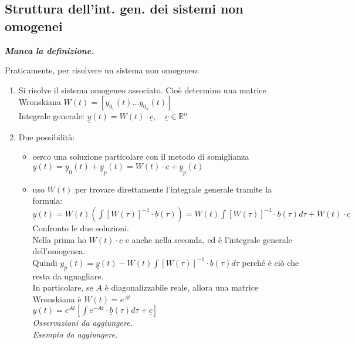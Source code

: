 \documentclass{scrreprt}
\begin{document}
\subsection{Struttura dell'int. gen. dei sistemi non omogenei}
\begin{center}
	\emph{\textbf{Manca la definizione.}}
\end{center}

Praticamente, per risolvere un sistema non omogeneo:
\begin{enumerate}
	\item Si risolve il sistema omogeneo associato. Cioè determino una matrice Wronskiana $W(t) = \left[y_{0_1}(t)\ldots y_{0_n}(t)\right]$\\
			Integrale generale: $ \underline{y}(t) = W(t)\cdot \underline{c}, \quad \underline{c}\in\mathbb{R}^n$
	\item Due possibilità: \begin{itemize}
		\item cerco una soluzione particolare con il metodo di somiglianza \\ $\underline{y}(t) = \underline{y}_0(t) + \underline{y}_p(t) = W(t) \cdot \underline{c} + \underline{y}_p(t)$
		\item uso $W(t)$ per trovare direttamente l'integrale generale tramite la formula:\\$ \underline{y}(t) = W(t) \left(\int\left[W(\tau)\right]^{-1}\cdot \underline{b}(\tau)\right) = W(t) \int \left[W(\tau)\right]^{-1} \cdot \underline{b}(\tau) d\tau + W(t)\cdot \underline{c}$
		Confronto le due soluzioni.\\
		Nella prima ho $W(t)\cdot\underline{c}$ e anche nella seconda, ed è l'integrale generale dell'omogenea.\\
		Quindi $y_p(t) = \underline{y}(t) - W(t)\int \left[W(\tau)\right]^{-1} \cdot \underline{b}(\tau) d\tau$ perché è ciò che resta da uguagliare.\\
		In particolare, se $A$ è diagonalizzabile reale, allora una matrice Wronskiana è $W(t) = e^{At}$\\
		$\underline{y}(t) = e^{At} \left[\int e^{-At}\cdot \underline{b}(\tau) d\tau + \underline{c}\right] $\\
		\emph{Osservazioni da aggiungere.}\\
		\emph{Esempio da aggiungere.}	
	\end{itemize}



\end{enumerate}
\end{document}
